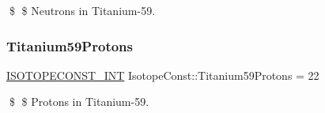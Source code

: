 \$ \$ Neutrons in Titanium-\/59. \mbox{\label{group___isotope_const-_titanium-_ti59_ga57ae650f587e23c5ef64460f06971ac0}} 
\subsubsection{\texorpdfstring{Titanium59\+Protons}{Titanium59Protons}}
{\footnotesize\ttfamily \mbox{\hyperlink{group___isotope_const-_macros_ga5f18360b3e99483a35c32d789e62621c}{I\+S\+O\+T\+O\+P\+E\+C\+O\+N\+S\+T\+\_\+\+I\+NT}} Isotope\+Const\+::\+Titanium59\+Protons = 22}

\$ \$ Protons in Titanium-\/59. 